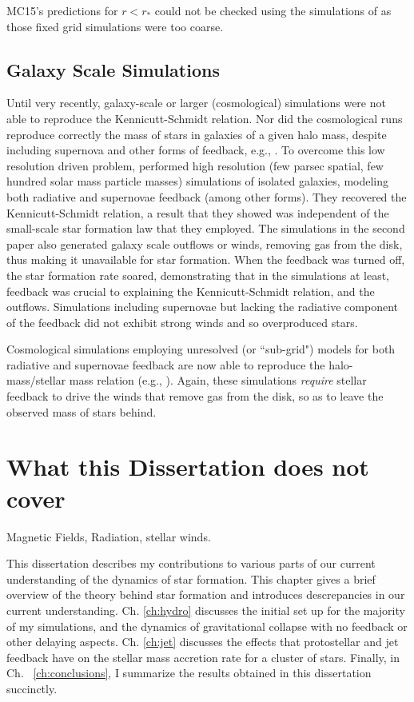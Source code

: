 \documentclass[../dissertation.tex]{subfiles}
\begin{document}
MC15's predictions for $r<r_*$ could not be checked using the simulations
of \citet{2015ApJ...800...49L} as those fixed grid simulations were
too coarse.  


\subsection {Galaxy Scale Simulations}

Until very recently, galaxy-scale or larger (cosmological) simulations 
were not able to reproduce the Kennicutt-Schmidt relation. 
Nor did the cosmological runs reproduce correctly the mass of stars in galaxies of a given 
halo mass, despite including supernova and other forms of feedback, 
e.g., \citet{2010MNRAS.404.1111G,2010Natur.463..203G,2011MNRAS.410.2625P}.
To overcome this low resolution driven problem, \citet{2011MNRAS.417..950H,2012MNRAS.421.3522H}
performed high resolution (few parsec spatial, few hundred solar mass particle masses) simulations 
of isolated galaxies, modeling both radiative and supernovae feedback (among other forms). 
They recovered the Kennicutt-Schmidt relation, a result that they 
showed was independent of the small-scale star formation
law that they employed. 
The simulations in the second paper also generated galaxy 
scale outflows or winds, removing gas from the disk, thus making it unavailable for star 
formation. 
When the feedback was turned off, the star formation rate soared, demonstrating that
in the simulations at least, feedback was crucial to explaining the Kennicutt-Schmidt relation, and
the outflows. 
Simulations including supernovae but lacking the radiative component of the feedback
did not exhibit strong winds and so overproduced stars.

Cosmological simulations employing unresolved (or ``sub-grid") models for both 
radiative and supernovae feedback are now able to reproduce the halo-mass/stellar mass relation (e.g.,
\citealt{2013MNRAS.434.3142A,2014MNRAS.445..581H,2015ApJ...804...18A}). Again, 
these simulations {\em require} 
stellar feedback to drive the winds that remove gas from the disk, so as to leave the observed mass of stars behind. 


\section{What this Dissertation does not cover}
Magnetic Fields, Radiation, stellar winds.


This dissertation describes my contributions to various parts of our current understanding of the dynamics of star formation. 
This chapter gives a brief overview of the theory behind star formation and introduces descrepancies in our current understanding. 
Ch. \ref{ch:hydro} discusses the initial set up for the majority of my simulations, and the dynamics of gravitational collapse with no feedback or other delaying aspects.
Ch. \ref{ch:jet} discusses the effects that protostellar and jet feedback have on the stellar mass accretion rate for a cluster of stars.
Finally, in Ch. ~\ref{ch:conclusions}, I summarize the results obtained in this dissertation succinctly.
\end{document}
